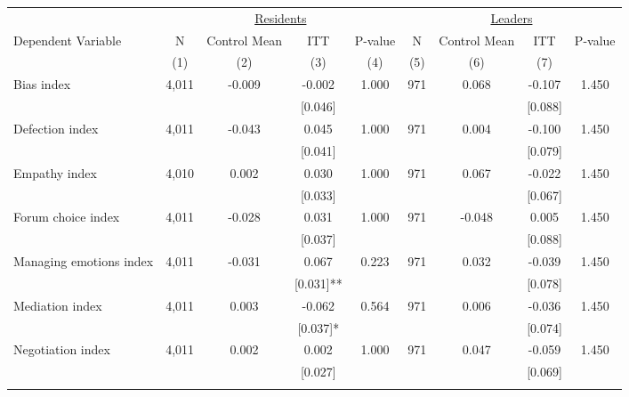 \begin{tabular}{lcccccccc}
\hline \noalign{\smallskip} & \multicolumn{4}{c}{\uline{\hfill Residents \hfill}} & \multicolumn{4}{c}{\uline{\hfill Leaders \hfill}}\\
Dependent Variable & N & Control Mean & ITT & P-value & N & Control Mean & ITT & P-value\\
 & (1) & (2) & (3) & (4) & (5) & (6) & (7) & \\
\noalign{\smallskip}\hline \noalign{\smallskip}Bias index & 4,011 & -0.009 & -0.002 & 1.000 & 971 & 0.068 & -0.107 & 1.450\\
 &  &  & [0.046] &  &  &  & [0.088] & \\
Defection index & 4,011 & -0.043 & 0.045 & 1.000 & 971 & 0.004 & -0.100 & 1.450\\
 &  &  & [0.041] &  &  &  & [0.079] & \\
Empathy index & 4,010 & 0.002 & 0.030 & 1.000 & 971 & 0.067 & -0.022 & 1.450\\
 &  &  & [0.033] &  &  &  & [0.067] & \\
Forum choice index & 4,011 & -0.028 & 0.031 & 1.000 & 971 & -0.048 & 0.005 & 1.450\\
 &  &  & [0.037] &  &  &  & [0.088] & \\
Managing emotions index & 4,011 & -0.031 & 0.067 & 0.223 & 971 & 0.032 & -0.039 & 1.450\\
 &  &  & [0.031]** &  &  &  & [0.078] & \\
Mediation index & 4,011 & 0.003 & -0.062 & 0.564 & 971 & 0.006 & -0.036 & 1.450\\
 &  &  & [0.037]* &  &  &  & [0.074] & \\
Negotiation index & 4,011 & 0.002 & 0.002 & 1.000 & 971 & 0.047 & -0.059 & 1.450\\
 &  &  & [0.027] &  &  &  & [0.069] & \\
\noalign{\smallskip}\hline\end{tabular}
